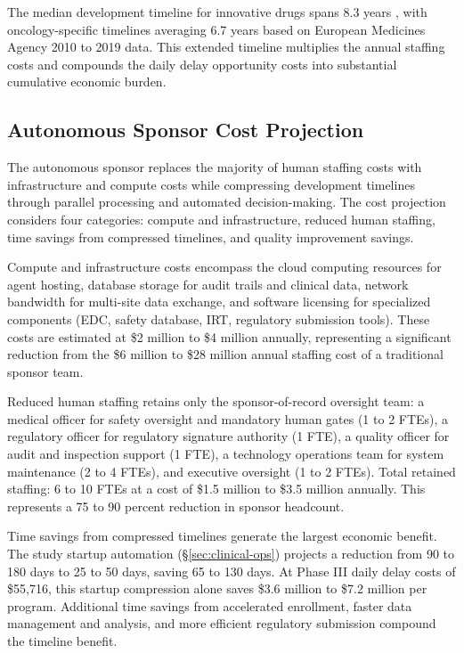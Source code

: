 The median development timeline for innovative drugs spans 8.3 years \cite{tufts-timeline},
with oncology-specific timelines averaging 6.7 years based on European Medicines Agency
2010 to 2019 data. This extended timeline multiplies the annual staffing costs and
compounds the daily delay opportunity costs into substantial cumulative economic burden.

\subsection{Autonomous Sponsor Cost Projection}

The autonomous sponsor replaces the majority of human staffing costs with infrastructure
and compute costs while compressing development timelines through parallel processing
and automated decision-making. The cost projection considers four categories: compute
and infrastructure, reduced human staffing, time savings from compressed timelines, and
quality improvement savings.

Compute and infrastructure costs encompass the cloud computing resources for agent
hosting, database storage for audit trails and clinical data, network bandwidth for
multi-site data exchange, and software licensing for specialized components (EDC, safety
database, IRT, regulatory submission tools). These costs are estimated at \$2 million to
\$4 million annually, representing a significant reduction from the \$6 million to \$28
million annual staffing cost of a traditional sponsor team.

Reduced human staffing retains only the sponsor-of-record oversight team: a medical
officer for safety oversight and mandatory human gates (1 to 2 FTEs), a regulatory
officer for regulatory signature authority (1 FTE), a quality officer for audit and
inspection support (1 FTE), a technology operations team for system maintenance (2 to 4
FTEs), and executive oversight (1 to 2 FTEs). Total retained staffing: 6 to 10 FTEs at a
cost of \$1.5 million to \$3.5 million annually. This represents a 75 to 90 percent
reduction in sponsor headcount.

Time savings from compressed timelines generate the largest economic benefit. The study
startup automation (\S\ref{sec:clinical-ops}) projects a reduction from 90 to 180 days
to 25 to 50 days, saving 65 to 130 days. At Phase III daily delay costs of \$55,716,
this startup compression alone saves \$3.6 million to \$7.2 million per program.
Additional time savings from accelerated enrollment, faster data management and analysis,
and more efficient regulatory submission compound the timeline benefit.

